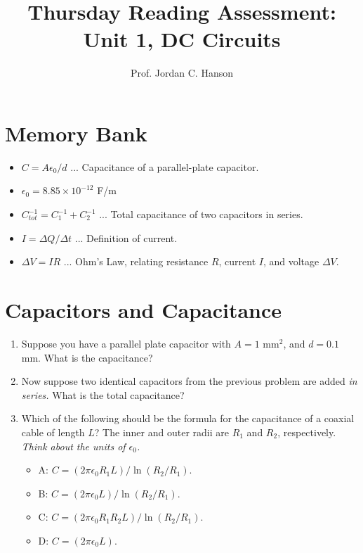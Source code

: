 \documentclass{article}
\begin{document}
\title{Thursday Reading Assessment: Unit 1, DC Circuits}
\author{Prof. Jordan C. Hanson}

\maketitle

\section{Memory Bank}

\begin{itemize}
\item $C = A\epsilon_0/d$ ... Capacitance of a parallel-plate capacitor.
\item $\epsilon_0 = 8.85 \times 10^{-12}$ F/m
\item $C_{tot}^{-1} = C_1^{-1} + C_2^{-1}$ ... Total capacitance of two capacitors in series.
\item $I = \Delta Q/\Delta t$ ... Definition of current.
\item $\Delta V = I R$ ... Ohm's Law, relating resistance $R$, current $I$, and voltage $\Delta V$.
\end{itemize}

\section{Capacitors and Capacitance}

\begin{enumerate}
\item Suppose you have a parallel plate capacitor with $A = 1$ mm$^2$, and $d = 0.1$ mm.  What is the capacitance? \\ \vspace{0.5cm}
\item Now suppose two identical capacitors from the previous problem are added \textit{in series.}  What is the total capacitance? \\ \vspace{0.5cm}
\item Which of the following should be the formula for the capacitance of a coaxial cable of length $L$?  The inner and outer radii are $R_1$ and $R_2$, respectively.  \textit{Think about the units of $\epsilon_0$.}
\begin{itemize}
\item A: $C = (2\pi\epsilon_0 R_1 L)/\ln(R_2/R_1)$.
\item B: $C = (2\pi\epsilon_0 L)/\ln(R_2/R_1)$.
\item C: $C = (2\pi\epsilon_0 R_1 R_2 L)/\ln(R_2/R_1)$.
\item D: $C = (2\pi\epsilon_0 L)$.
\end{itemize}
\end{enumerate}
\end{document}
